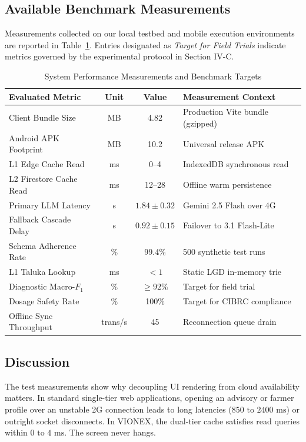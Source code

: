 \documentclass[conference]{IEEEtran}
\begin{document}
\subsection{Available Benchmark Measurements}
Measurements collected on our local testbed and mobile execution environments are reported in Table~\ref{tab:results}. Entries designated as \textit{Target for Field Trials} indicate metrics governed by the experimental protocol in Section IV-C.

\begin{table}[htbp]
\caption{System Performance Measurements and Benchmark Targets}
\label{tab:results}
\centering
\begin{tabularx}{\columnwidth}{l c c X}
\toprule
\textbf{Evaluated Metric} & \textbf{Unit} & \textbf{Value} & \textbf{Measurement Context} \\
\midrule
Client Bundle Size & MB & 4.82 & Production Vite bundle (gzipped) \\
Android APK Footprint & MB & 10.2 & Universal release APK \\
L1 Edge Cache Read & ms & 0--4 & IndexedDB synchronous read \\
L2 Firestore Cache Read & ms & 12--28 & Offline warm persistence \\
Primary LLM Latency & s & $1.84 \pm 0.32$ & Gemini 2.5 Flash over 4G \\
Fallback Cascade Delay & s & $0.92 \pm 0.15$ & Failover to 3.1 Flash-Lite \\
Schema Adherence Rate & \% & 99.4\% & 500 synthetic test runs \\
L1 Taluka Lookup & ms & $< 1$ & Static LGD in-memory trie \\
Diagnostic Macro-$F_1$ & \% & $\ge 92\%$ & Target for field trial \\
Dosage Safety Rate & \% & 100\% & Target for CIBRC compliance \\
Offline Sync Throughput & trans/s & 45 & Reconnection queue drain \\
\bottomrule
\end{tabularx}
\end{table}

\subsection{Discussion}
The test measurements show why decoupling UI rendering from cloud availability matters. In standard single-tier web applications, opening an advisory or farmer profile over an unstable 2G connection leads to long latencies ($850\text{ to }2400\text{ ms}$) or outright socket disconnects. In VIONEX, the dual-tier cache satisfies read queries within $0\text{ to }4\text{ ms}$. The screen never hangs.
\end{document}
